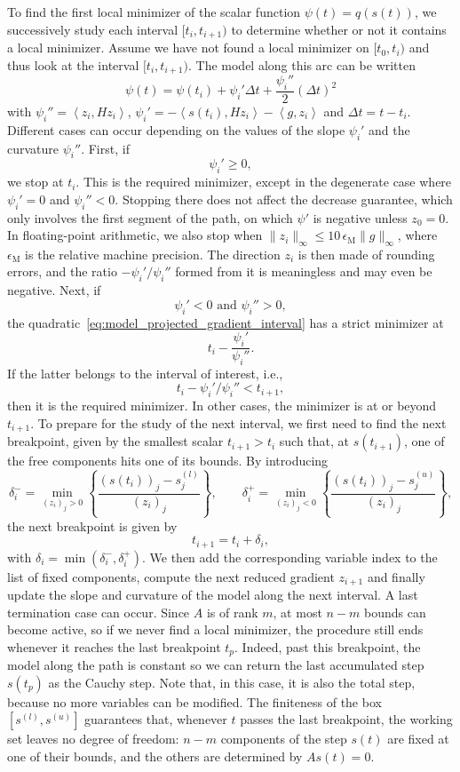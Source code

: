 \documentclass[pdflatex,sn-mathphys-num]{sn-jnl}%
\theoremstyle{thmstyleone}%
\newcommand{\inner}[2]{\left\langle {#1} , {#2} \right\rangle} %
\begin{document}
\begin{appendices}
To find the first local minimizer of the scalar function $\psi(t) = q(s(t))$, we successively study each interval $[t_i, t_{i+1})$ to determine whether or not it contains a local minimizer.
Assume we have not found a local minimizer on $[t_0, t_i)$ and thus look at the interval $[t_i, t_{i+1})$. The model along this arc can be written
\begin{equation}\label{eq:model_projected_gradient_interval}
	\psi(t) = \psi(t_i) + \psi_i'\Delta t + \dfrac{\psi_i''}{2}(\Delta t)^2
\end{equation}
with
$\psi_i'' = \inner{z_i}{Hz_i}$, $\psi_i' = -\inner{s(t_i)}{Hz_i} - \inner{g}{z_i}$ and $\Delta t = t-t_i$.
Different cases can occur depending on the values of the slope $\psi_i'$ and the curvature $\psi_i''$. 
First, if
\[\psi_i' \ge 0,\]
we stop at $t_i$. This is the required minimizer, except in the degenerate case where $\psi_i' = 0$ and $\psi_i'' < 0$. Stopping there does not affect the decrease guarantee, which only involves the first segment of the path, on which $\psi'$ is negative unless $z_0 = 0$. In floating-point arithmetic, we also stop when $\|z_i\|_\infty \le 10\,\epsilon_{\mathrm{M}}\|g\|_\infty$, where $\epsilon_{\mathrm{M}}$ is the relative machine precision. The direction $z_i$ is then made of rounding errors, and the ratio $-\psi_i'/\psi_i''$ formed from it is meaningless and may even be negative. Next, if
\[\psi_i' < 0 \text{ and } \psi_i'' > 0,\]
the quadratic~\eqref{eq:model_projected_gradient_interval} has a strict minimizer at
\[t_i- \dfrac{\psi_i'}{\psi_i''}.\]
If the latter belongs to the interval of interest, i.e.,
\[t_i-\psi_i'/\psi_i'' < t_{i+1},\]
then it is the required minimizer. In other cases, the minimizer is at or beyond $t_{i+1}$. To prepare for the study of the next interval, we first need to find the next breakpoint, given by the smallest scalar $t_{i+1}>t_i$ such that, at $s(t_{i+1})$, one of the free components hits one of its bounds. By introducing
\[\delta_i^- = \min_{(z_i)_j > 0} \left\{ \dfrac{(s(t_i))_j - s^{(l)}_j}{(z_i)_j}\right\}, \qquad \delta_i^+ = \min_{(z_i)_j < 0} \left\{ \dfrac{(s(t_i))_j - s^{(u)}_j}{(z_i)_j}\right\},\]
the next breakpoint is given by 
\begin{equation}\label{eq:next_breakpoint}
	t_{i+1} = t_i + \delta_i,
\end{equation} 
with $\delta_i = \min\left(\delta_i^-, \delta_i^+\right)$. We then add the corresponding variable index to the list of fixed components, compute the next reduced gradient $z_{i+1}$ and finally update the slope and curvature of the model along the next interval. A last termination case can occur. Since $A$ is of rank $m$, at most $n-m$ bounds can become active, so if we never find a local minimizer, the procedure still ends whenever it reaches the last breakpoint $t_{p}$. Indeed, past this breakpoint, the model along the path is constant so we can return the last accumulated step $s(t_p)$ as the Cauchy step. Note that, in this case, it is also the total step, because no more variables can be modified. The finiteness of the box $\left[s^{(l)}, s^{(u)}\right]$ guarantees that, whenever $t$ passes the last breakpoint, the working set leaves no degree of freedom: $n-m$ components of the step $s(t)$ are fixed at one of their bounds, and the others are determined by $As(t) = 0$.

\end{appendices}
\end{document}
